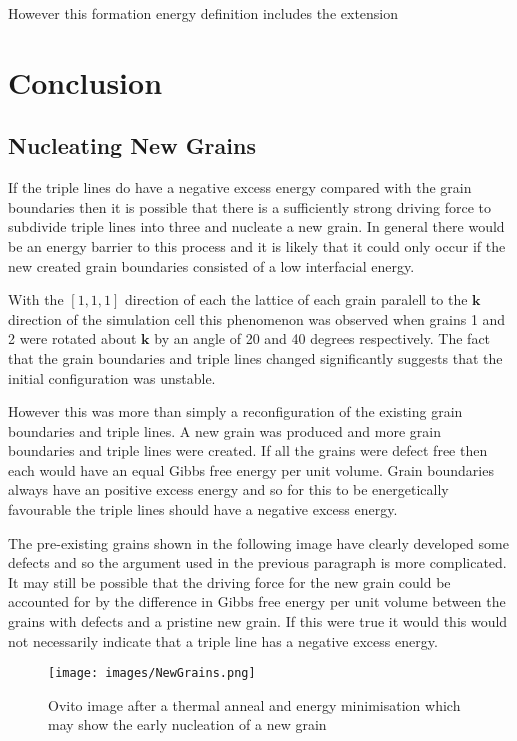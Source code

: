 \documentclass[12pt,a4paper]{book}
\begin{document}
However this formation energy definition includes the extension  


\chapter{Conclusion}

\section{Nucleating New Grains}

If the triple lines do have a negative excess energy compared with the grain boundaries then it is possible that there is a sufficiently strong driving force to subdivide triple lines into three and nucleate a new grain. In general there would be an energy barrier to this process and it is likely that it could only occur if the new created grain boundaries consisted of a low interfacial energy.

With the $[1,1,1]$ direction of each the lattice of each grain paralell to the $\mathbf{k}$ direction of the simulation cell this phenomenon was observed when grains 1 and 2 were rotated about $\mathbf{k}$  by an angle of 20 and 40 degrees respectively. The fact that the grain boundaries and triple lines changed significantly suggests that the initial configuration was unstable. 

However this was more than simply a reconfiguration of the existing grain boundaries and triple lines. A new grain was produced and more grain boundaries and triple lines were created. If all the grains were defect free then each would have an equal Gibbs free energy per unit volume. Grain boundaries always have an positive excess energy and so for this to be energetically favourable the triple lines should have a negative excess energy.

The pre-existing grains shown in the following image have clearly developed some defects and so the argument used in the previous paragraph is more complicated. It may still be possible that the driving force for the new grain could be accounted for by the difference in Gibbs free energy per unit volume between the grains with defects and a pristine new grain. If this were true it would this would not necessarily indicate that a triple line has a negative excess energy.

\begin{figure}
	\centering
	\texttt{[image: images/NewGrains.png]} 
	\label{fig:NewGrains}
	\caption{Ovito image after a thermal anneal and energy minimisation which may show the early nucleation of a new grain}
\end{figure}
\end{document}
